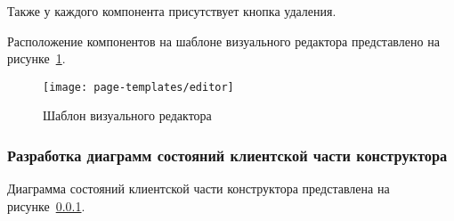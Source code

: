 Также у каждого компонента присутствует кнопка удаления.

Расположение компонентов на шаблоне визуального редактора
представлено на рисунке~\ref{f:editor-template}.

\begin{figure}[ht]
	\centering
	\vspace{0.5cm}
	\texttt{[image: page-templates/editor]}
	\caption{Шаблон визуального редактора}
	\label{f:editor-template}
	\vspace{0.5cm}
\end{figure}


\subsubsection{Разработка диаграмм состояний клиентской части конструктора}

Диаграмма состояний клиентской части конструктора представлена на
рисунке~\ref{}.



